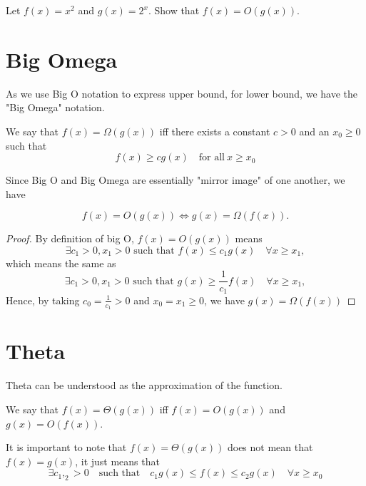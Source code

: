 \begin{exercise}
    Let \(f(x) = x^2\) and \(g(x) = 2^x\). Show that \(f(x) = O(g(x))\).
\end{exercise}

\section{Big Omega}
As we use Big O notation to express upper bound, for lower bound, we have the "Big Omega" notation.
\begin{definition}
    We say that \(f(x) = \Omega(g(x))\) iff there exists a constant \(c > 0\) and an \(x_0 \geq 0\) such that
    \[
    f(x) \geq cg(x)\quad\text{for all}\ x \geq x_0
    \]
\end{definition}

Since Big O and Big Omega are essentially "mirror image" of one another, we have

\begin{theorem}
   \[
    f(x) = O(g(x)) \Longleftrightarrow g(x) = \Omega (f(x)).
   \] 
\end{theorem}

\begin{proof}
    By definition of big O, \(f(x) = O(g(x))\) means
    \[
        \exists c_1 > 0, x_1 > 0 \text{ such that } f(x) \leq c_1 g(x) \quad \forall x \geq x_1,
    \] 
    which means the same as
    \[
        \exists c_1 > 0, x_1 > 0 \text{ such that } g(x) \geq \dfrac{1}{c_1}f(x) \quad \forall x \geq x_1,
    \]
    Hence, by taking \(c_0 = \frac{1}{c_1} > 0\) and \(x_0 = x_1 \geq 0\), we have \(g(x) = \Omega(f(x))\) 
\end{proof}

\section{Theta}
Theta can be understood as the approximation of the function. 
\begin{definition}
    We say that \(f(x) = \Theta(g(x))\) iff \(f(x) = O(g(x))\) and \(g(x) = O(f(x))\). 
    \begin{remark}
        It is important to note that \(f(x) = \Theta(g(x))\) does not mean that \(f(x) = g(x)\), it just means that
    \[
        \exists c_1, _2 > 0 \quad\text{such that}\quad c_1 g(x) \leq f(x) \leq c_2 g(x)\quad \forall x \geq  x_0 
    \] 
    \end{remark}
    
\end{definition}

